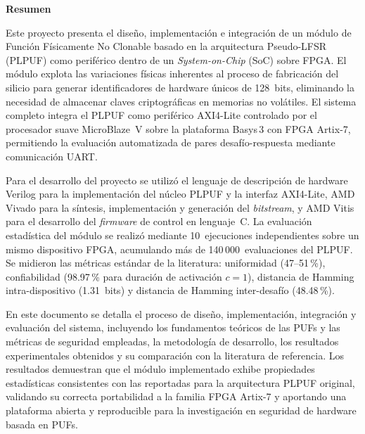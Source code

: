 
\thispagestyle{empty}
\cleardoublepage

\begin{center}
  \vspace*{1.5cm}
  {\Huge\bfseries Resumen}
\end{center}

\vspace{1.5cm}

Este proyecto presenta el diseño, implementación e integración de un módulo
de Función Físicamente No Clonable basado en la arquitectura Pseudo-LFSR
(PLPUF) como periférico dentro de un \textit{System-on-Chip} (SoC) sobre
FPGA. El módulo explota las variaciones físicas inherentes al proceso de
fabricación del silicio para generar identificadores de hardware únicos de
128~bits, eliminando la necesidad de almacenar claves criptográficas en
memorias no volátiles. El sistema completo integra el PLPUF como periférico
AXI4-Lite controlado por el procesador suave MicroBlaze~V sobre la plataforma
Basys\,3 con FPGA Artix-7, permitiendo la evaluación automatizada de pares
desafío-respuesta mediante comunicación UART.

Para el desarrollo del proyecto se utilizó el lenguaje de descripción de
hardware Verilog para la implementación del núcleo PLPUF y la interfaz
AXI4-Lite, AMD Vivado para la síntesis, implementación y generación del
\textit{bitstream}, y AMD Vitis para el desarrollo del \textit{firmware} de
control en lenguaje~C. La evaluación estadística del módulo se realizó
mediante 10~ejecuciones independientes sobre un mismo dispositivo FPGA,
acumulando más de 140\,000~evaluaciones del PLPUF. Se midieron las métricas
estándar de la literatura: uniformidad (47--51\,\%), confiabilidad (98.97\,\%
para duración de activación $c = 1$), distancia de Hamming intra-dispositivo
(1.31~bits) y distancia de Hamming inter-desafío (48.48\,\%).

En este documento se detalla el proceso de diseño, implementación,
integración y evaluación del sistema, incluyendo los fundamentos teóricos de
las PUFs y las métricas de seguridad empleadas, la metodología de
desarrollo, los resultados experimentales obtenidos y su comparación con la
literatura de referencia. Los resultados demuestran que el módulo
implementado exhibe propiedades estadísticas consistentes con las reportadas
para la arquitectura PLPUF original, validando su correcta portabilidad a la
familia FPGA Artix-7 y aportando una plataforma abierta y reproducible para
la investigación en seguridad de hardware basada en PUFs.

